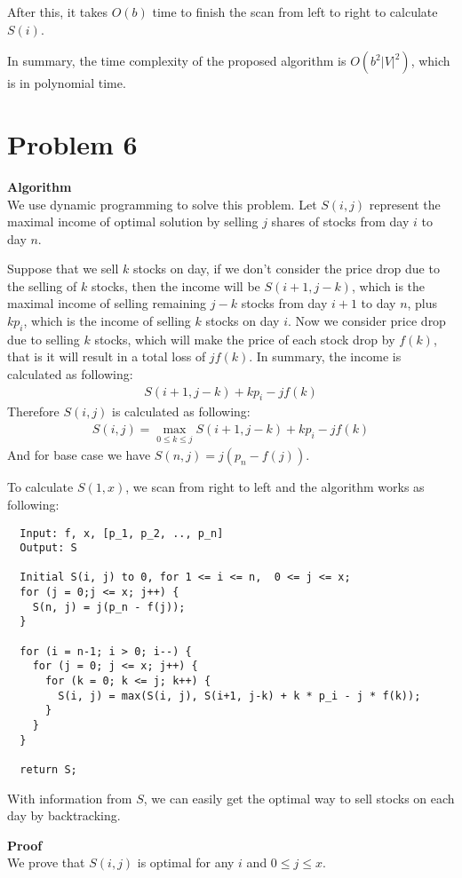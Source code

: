 \documentclass{article}
\newcommand{\Proof}{\vspace{0.3cm} \noindent\textbf{Proof} \\}
\newcommand{\Algorithm}{\textbf{Algorithm} \\}
\begin{document}
After this, it takes $O(b)$ time to finish the scan from left to right to calculate $S(i)$. 

In summary, the time complexity of the proposed algorithm is $O(b^2 |V|^2)$, which is in polynomial
time.

\section*{Problem 6}
\Algorithm
We use dynamic programming to solve this problem. Let $S(i, j)$ represent the maximal income of
optimal solution by selling $j$ shares of stocks from day $i$ to day $n$.

Suppose that we sell $k$ stocks on day, if we don't consider the price drop due to the selling of
$k$ stocks, then the income will be $ S(i+1, j-k)$, which is the maximal income of selling remaining 
$j-k$ stocks from day $i+1$ to day $n$, plus $k p_i$, which is the income of selling $k$ stocks on
day $i$. Now we consider price drop due to selling $k$ stocks, which will make the price of each
stock drop by $f(k)$, that is it will result in a total loss of $jf(k)$. In summary, the income
is calculated as following:
\begin{align}
  S(i+1, j - k) + k p_i - jf(k) 
\end{align}
Therefore $S(i, j)$ is calculated as following:
\begin{align}\label{equ1}
  S(i, j) = \max_{0 \leq k \leq j} S(i+1, j-k) + k p_i - jf(k)
\end{align}
And for base case we have $S(n, j) = j(p_n - f(j))$. 

To calculate $S(1, x)$, we scan from right to left and the algorithm works as following:
\begin{verbatim}
  Input: f, x, [p_1, p_2, .., p_n]
  Output: S

  Initial S(i, j) to 0, for 1 <= i <= n,  0 <= j <= x;
  for (j = 0;j <= x; j++) {
    S(n, j) = j(p_n - f(j));
  }

  for (i = n-1; i > 0; i--) {
    for (j = 0; j <= x; j++) {
      for (k = 0; k <= j; k++) {
        S(i, j) = max(S(i, j), S(i+1, j-k) + k * p_i - j * f(k));
      }
    }
  }

  return S;
\end{verbatim}

With information from $S$, we can easily get the optimal way to sell stocks on each day by
backtracking.

\Proof
We prove that $S(i, j)$ is optimal for any $i$ and $ 0 \leq j \leq x$.
\end{document}
